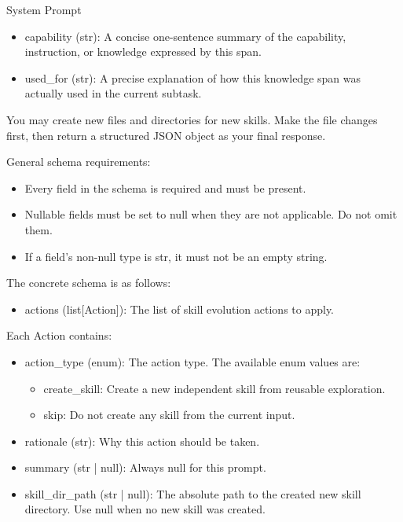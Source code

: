 \documentclass{llmxive}
\providecommand{\svpromptheading}[1]{\par\smallskip\noindent{\sffamily\bfseries#1}\par}
\providecommand{\svinlinecode}[1]{{\ttfamily #1}}
\begin{document}
\begin{svpromptbox}{System Prompt}
\begin{itemize}
\item \svinlinecode{capability} (\svinlinecode{str}): A concise one-sentence summary of the capability, instruction, or knowledge expressed by this span.
\item \svinlinecode{used\_for} (\svinlinecode{str}): A precise explanation of how this knowledge span was actually used in the current subtask.
\end{itemize}
\smallskip
\svpromptheading{Output}
\smallskip
You may create new files and directories for new skills. Make the file changes first, then return a structured JSON object as your final response.\par
\smallskip
General schema requirements:\par
\smallskip
\begin{itemize}
\item Every field in the schema is required and must be present.
\item Nullable fields must be set to \svinlinecode{null} when they are not applicable. Do not omit them.
\item If a field's non-null type is \svinlinecode{str}, it must not be an empty string.
\end{itemize}
\smallskip
The concrete schema is as follows:\par
\smallskip
\begin{itemize}
\item \svinlinecode{actions} (\svinlinecode{list[Action]}): The list of skill evolution actions to apply.
\end{itemize}
\smallskip
Each \svinlinecode{Action} contains:\par
\smallskip
\begin{itemize}
\item \svinlinecode{action\_type} (\svinlinecode{enum}): The action type. The available enum values are:
\begin{itemize}
\item \svinlinecode{create\_skill}: Create a new independent skill from reusable exploration.
\item \svinlinecode{skip}: Do not create any skill from the current input.
\end{itemize}
\item \svinlinecode{rationale} (\svinlinecode{str}): Why this action should be taken.
\item \svinlinecode{summary} (\svinlinecode{str | null}): Always \svinlinecode{null} for this prompt.
\item \svinlinecode{skill\_dir\_path} (\svinlinecode{str | null}): The absolute path to the created new skill directory. Use \svinlinecode{null} when no new skill was created.

\end{itemize}
\end{svpromptbox}
\end{document}
